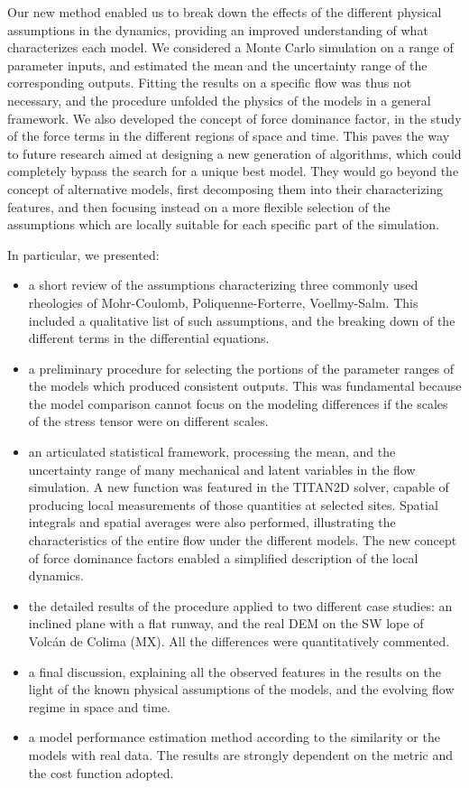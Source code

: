 \documentclass{article}
\begin{document}
Our new method enabled us to break down the effects of the different physical assumptions in the dynamics, providing an improved understanding of what characterizes each model. We considered a Monte Carlo simulation on a range of parameter inputs, and estimated the mean and the uncertainty range of the corresponding outputs. Fitting the results on a specific flow was thus not necessary, and the procedure unfolded the physics of the models in a general framework. We also developed the concept of force dominance factor, in the study of the force terms in the different regions of space and time. This paves the way to future research aimed at designing a new generation of algorithms, which could completely bypass the search for a unique best model. They would go beyond the concept of alternative models, first decomposing them into their characterizing features, and then focusing instead on a more flexible selection of the assumptions which are locally suitable for each specific part of the simulation.

In particular, we presented:
\begin{itemize}
  \item a short review of the assumptions characterizing three commonly used rheologies of Mohr-Coulomb, Poliquenne-Forterre, Voellmy-Salm. This included a qualitative list of such assumptions, and the breaking down of the different terms in the differential equations.
  \item a preliminary procedure for selecting the portions of the parameter ranges of the models which produced consistent outputs. This was fundamental because the model comparison cannot focus on the modeling differences if the scales of the stress tensor were on different scales.
  \item an articulated statistical framework, processing the mean, and the uncertainty range of many mechanical and latent variables in the flow simulation. A new function was featured in the TITAN2D solver, capable of producing local measurements of those quantities at selected sites. Spatial integrals and spatial averages were also performed, illustrating the characteristics of the entire flow under the different models. The new concept of force dominance factors enabled a simplified description of the local dynamics.
  \item the detailed results of the procedure applied to two different case studies: an inclined plane with a flat runway, and the real DEM on the SW lope of Volc\'{a}n de Colima (MX). All the differences were quantitatively commented.
  \item a final discussion, explaining all the observed features in the results on the light of the known physical assumptions of the models, and the evolving flow regime in space and time.
  \item a model performance estimation method according to the similarity or the models with real data. The results are strongly dependent on the metric and the cost function adopted.
\end{itemize}
\end{document}
